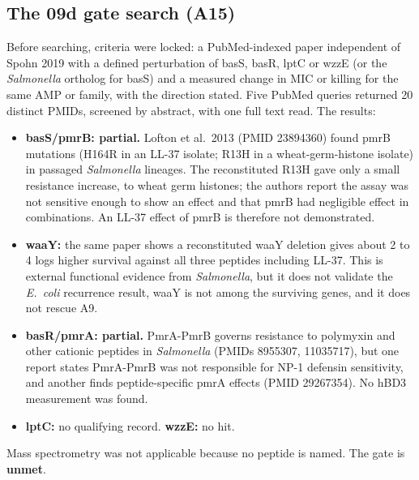 \documentclass[11pt,letterpaper]{article}
\begin{document}
\subsection{The 09d gate search (A15)}\label{sec:a15}
Before searching, criteria were locked: a PubMed-indexed paper independent of Spohn 2019 with a defined perturbation of basS, basR, lptC or wzzE (or the \textit{Salmonella} ortholog for basS) and a measured change in MIC or killing for the same AMP or family, with the direction stated. Five PubMed queries returned 20 distinct PMIDs, screened by abstract, with one full text read. The results:
\begin{itemize}\setlength\itemsep{1pt}
\item \textbf{basS/pmrB: partial.} Lofton et al.\ 2013 (PMID 23894360) found pmrB mutations (H164R in an LL-37 isolate; R13H in a wheat-germ-histone isolate) in passaged \textit{Salmonella} lineages. The reconstituted R13H gave only a small resistance increase, to wheat germ histones; the authors report the assay was not sensitive enough to show an effect and that pmrB had negligible effect in combinations. An LL-37 effect of pmrB is therefore not demonstrated.
\item \textbf{waaY:} the same paper shows a reconstituted waaY deletion gives about 2 to 4 logs higher survival against all three peptides including LL-37. This is external functional evidence from \textit{Salmonella}, but it does not validate the \textit{E.\ coli} recurrence result, waaY is not among the surviving genes, and it does not rescue A9.
\item \textbf{basR/pmrA: partial.} PmrA-PmrB governs resistance to polymyxin and other cationic peptides in \textit{Salmonella} (PMIDs 8955307, 11035717), but one report states PmrA-PmrB was not responsible for NP-1 defensin sensitivity, and another finds peptide-specific pmrA effects (PMID 29267354). No hBD3 measurement was found.
\item \textbf{lptC:} no qualifying record. \textbf{wzzE:} no hit.
\end{itemize}
Mass spectrometry was not applicable because no peptide is named. The gate is \textbf{unmet}.
\end{document}
